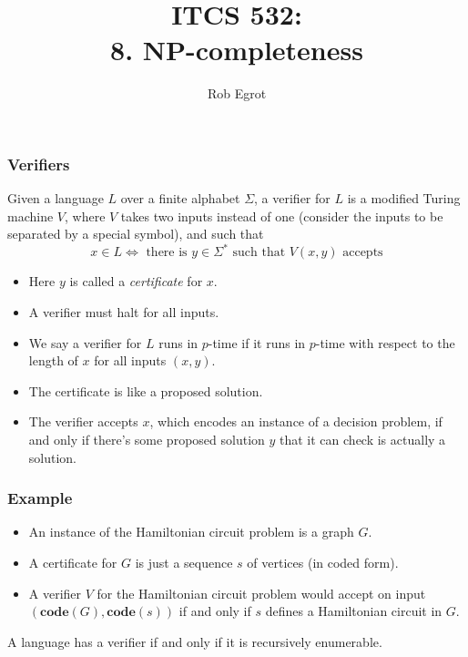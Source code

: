 \documentclass[handout]{beamer}
\title{ITCS 532:\\ 
8. $\mathbf{NP}$-completeness}
\date{}
\author{Rob Egrot}
\newcommand{\co}{\mathbf{code}}
\begin{document}
\begin{frame}
\titlepage
\end{frame}


\begin{frame}
\frametitle{Verifiers}
\begin{definition}[Verifier]
Given a language $L$ over a finite alphabet $\Sigma$, a verifier for $L$ is a modified Turing machine $V$, where $V$ takes two inputs instead of one (consider the inputs to be separated by a special symbol), and such that
\[x\in L\iff \text{ there is } y\in\Sigma^* \text{ such that } V(x,y) \text{ accepts}\] 
\end{definition}
\begin{itemize}
\item Here $y$ is called a \emph{certificate} for $x$. 
\item A verifier must halt for all inputs. 
\item We say a verifier for $L$ runs in $p$-time if it runs in $p$-time with respect to the length of $x$ for all inputs $(x,y)$. 
\item The certificate is like a proposed solution. 
\item The verifier accepts $x$, which encodes an instance of a decision problem, if and only if there's some proposed solution $y$ that it can check is actually a solution. 
\end{itemize}
\end{frame}

\begin{frame}
\frametitle{Example}
\begin{example}
\begin{itemize}
\item An instance of the Hamiltonian circuit problem is a graph $G$. 
\item A certificate for $G$ is just a sequence $s$ of vertices (in coded form). 
\item A verifier $V$ for the Hamiltonian  circuit problem would accept on input $(\co(G),\co(s))$ if and only if $s$ defines a Hamiltonian circuit in $G$.
\end{itemize} 
\end{example}
\vspace{0.5cm}
\begin{theorem}
A language has a verifier if and only if it is recursively enumerable.
\end{theorem}
\end{frame}
\end{document}
